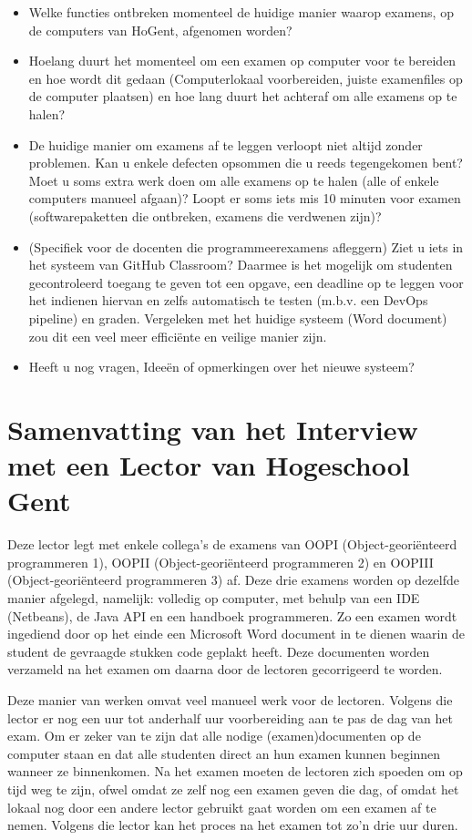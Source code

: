 \begin{itemize}
\begin{itemize}
\end{itemize}	
	\bigskip 
	\item Welke functies ontbreken momenteel de huidige manier waarop examens, op de computers van HoGent, afgenomen worden?
	\bigskip 
	\item Hoelang duurt het momenteel om een examen op computer voor te bereiden en hoe wordt dit gedaan (Computerlokaal voorbereiden, juiste examenfiles op de computer plaatsen) en hoe lang duurt het achteraf om alle examens op te halen?
	\bigskip 
	\item De huidige manier om examens af te leggen verloopt niet altijd zonder problemen. Kan u enkele defecten opsommen die u reeds tegengekomen bent? Moet u soms extra werk doen om alle examens op te halen (alle of enkele computers manueel afgaan)? Loopt er soms iets mis 10 minuten voor examen (softwarepaketten die ontbreken, examens die verdwenen zijn)? 
	\bigskip
	\item (Specifiek voor de docenten die programmeerexamens afleggern) Ziet u iets in het systeem van GitHub Classroom? Daarmee is het mogelijk om studenten gecontroleerd toegang te geven tot een opgave, een deadline op te leggen voor het indienen hiervan en zelfs automatisch te testen (m.b.v. een DevOps pipeline) en graden. Vergeleken met het huidige systeem (Word document) zou dit een veel meer efficiënte en veilige manier zijn.
	\bigskip 
	\item Heeft u nog vragen, Ideeën of opmerkingen over het nieuwe systeem?
	
\end{itemize}

\section{Samenvatting van het Interview met een Lector van Hogeschool Gent }

Deze lector legt met enkele collega's de examens van OOPI (Object-georiënteerd programmeren 1), OOPII (Object-georiënteerd programmeren 2) en OOPIII (Object-georiënteerd programmeren 3) af. Deze drie examens worden op dezelfde manier afgelegd, namelijk: volledig op computer, met behulp van een IDE (Netbeans), de Java API en een handboek programmeren. Zo een examen wordt ingediend door op het einde een Microsoft Word document in te dienen waarin de student de gevraagde stukken code geplakt heeft. Deze documenten worden verzameld na het examen om daarna door de lectoren gecorrigeerd te worden. 
\medskip 

Deze manier van werken omvat veel manueel werk voor de lectoren. Volgens die lector er nog een uur tot anderhalf uur voorbereiding aan te pas de dag van het exam. Om er zeker van te zijn dat alle nodige (examen)documenten op de computer staan en dat alle studenten direct an hun examen kunnen beginnen wanneer ze binnenkomen. Na het examen moeten de lectoren zich spoeden om op tijd weg te zijn, ofwel omdat ze zelf nog een examen geven die dag, of omdat het lokaal nog door een andere lector gebruikt gaat worden om een examen af te nemen. Volgens die lector kan het proces na het examen tot zo'n drie uur duren.  

